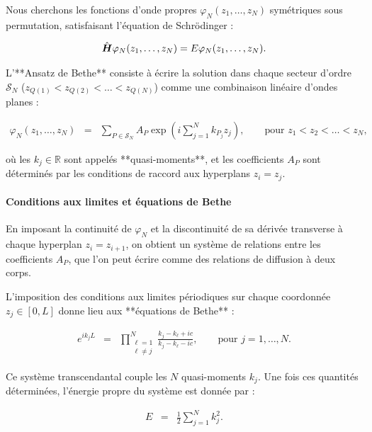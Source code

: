 Nous cherchons les fonctions d’onde propres \(\varphi_N(z_1, \dots, z_N)\) symétriques sous permutation, satisfaisant l’équation de Schrödinger :

\begin{eqnarray}
	\hat{\bm{H}} \varphi_N(z_1, \dots, z_N) = E \varphi_N(z_1, \dots, z_N).
\end{eqnarray}

L’**Ansatz de Bethe** consiste à écrire la solution dans chaque secteur d’ordre \(\mathcal{S}_N\) (\(z_{Q(1)} < z_{Q(2)} < \dots < z_{Q(N)}\)) comme une combinaison linéaire d’ondes planes :

\begin{eqnarray}
	\varphi_N(z_1, \dots, z_N) & = & \sum_{P \in \mathcal{S}_N} A_P \exp\left(i \sum_{j=1}^N k_{P_j} z_j \right), \qquad \text{pour } z_1 < z_2 < \dots < z_N,
\end{eqnarray}

où les \(k_j \in \mathbb{R}\) sont appelés **quasi-moments**, et les coefficients \(A_P\) sont déterminés par les conditions de raccord aux hyperplans \(z_i = z_j\).

\paragraph{Conditions aux limites et équations de Bethe}

En imposant la continuité de \(\varphi_N\) et la discontinuité de sa dérivée transverse à chaque hyperplan \(z_i = z_{i+1}\), on obtient un système de relations entre les coefficients \(A_P\), que l’on peut écrire comme des relations de diffusion à deux corps.

L’imposition des conditions aux limites périodiques sur chaque coordonnée \(z_j \in [0, L]\) donne lieu aux **équations de Bethe** :

\begin{eqnarray}
	e^{i k_j L} & = & \prod_{\substack{\ell = 1 \\ \ell \neq j}}^N \frac{k_j - k_\ell + i c}{k_j - k_\ell - i c}, \qquad \text{pour } j = 1, \dots, N. \label{eq:bethe}
\end{eqnarray}

Ce système transcendantal couple les \(N\) quasi-moments \(k_j\). Une fois ces quantités déterminées, l’énergie propre du système est donnée par :

\begin{eqnarray}
	E & = & \frac{1}{2} \sum_{j=1}^N k_j^2.
\end{eqnarray}

